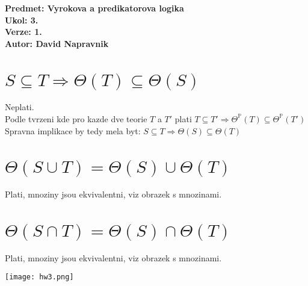\documentclass[a4paper]{article}
\begin{document}
\noindent
\textbf{Predmet: Vyrokova a predikatorova logika}\\
\textbf{Ukol: 3.}\\
\textbf{Verze: 1.}\\
\textbf{Autor: David Napravnik}

\section*{$S \subseteq T \Rightarrow \Theta(T) \subseteq \Theta(S)$}
Neplati.\\
Podle tvrzeni kde pro kazde dve teorie $T$ a $T'$ plati $T \subseteq T' \Rightarrow \Theta^{\mathbb{P}}(T) \subseteq \Theta^{\mathbb{P}}(T')$\\
Spravna implikace by tedy mela byt: $S \subseteq T \Rightarrow \Theta(S) \subseteq \Theta(T)$


\section*{$\Theta(S \cup T) = \Theta(S) \cup \Theta(T)$}
Plati, mnoziny jsou ekvivalentni, viz obrazek s mnozinami.


\section*{$\Theta(S \cap T) = \Theta(S) \cap \Theta(T)$}
Plati, mnoziny jsou ekvivalentni, viz obrazek s mnozinami.


\texttt{[image: hw3.png]}
\end{document}

